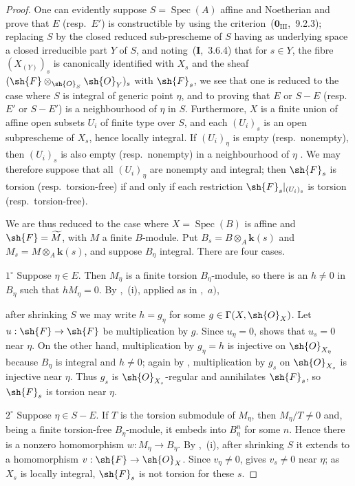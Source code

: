 \begin{proof}
One can evidently suppose $S=\operatorname{Spec}(A)$ affine and Noetherian and prove that $E$ (resp.\ $E'$) is constructible by using the criterion~($\mathbf{0}_{\mathrm{III}}$,~9.2.3); replacing $S$ by the closed reduced sub-prescheme of $S$ having as underlying space a closed irreducible part $Y$ of $S$, and noting~(\textbf{I},~3.6.4) that for $s\in Y$, the fibre $(X_{(Y)})_s$ is canonically identified with $X_s$ and the sheaf $(\sh{F}\otimes_{\sh{O}_S}\sh{O}_Y)_s$ with $\sh{F}_s$, we see that one is reduced to the case where $S$ is integral of generic point $\eta$, and to proving that $E$ or $S-E$ (resp.\ $E'$ or $S-E'$) is a neighbourhood of $\eta$ in $S$.
Furthermore, $X$ is a finite union of affine open subsets $U_i$ of finite type over $S$, and each $(U_i)_s$ is an open subprescheme of $X_s$, hence locally integral. If $(U_i)_\eta$ is empty (resp.\ nonempty), then $(U_i)_s$ is also empty (resp.\ nonempty) in a neighbourhood of $\eta$ . We may therefore suppose that all $(U_i)_\eta$ are nonempty and integral; then $\sh{F}_s$ is torsion (resp.\ torsion-free) if and only if each restriction $\sh{F}_s|_{(U_i)_s}$ is torsion (resp.\ torsion-free).

We are thus reduced to the case where $X=\operatorname{Spec}(B)$ is affine and $\sh{F}=\widetilde{M}$, with $M$ a finite $B$-module. Put $B_s=B\otimes_A\mathbf{k}(s)$ and $M_s=M\otimes_A\mathbf{k}(s)$, and suppose $B_\eta$ integral. There are four cases.

$1^\circ$ Suppose $\eta\in E$. Then $M_\eta$ is a finite torsion $B_\eta$-module, so there is an $h\neq 0$ in $B_\eta$ such that $hM_\eta=0$. By ,~(i), applied as in ,~$a)$,


after shrinking $S$ we may write $h=g_\eta$ for some $g\in\Gamma(X,\sh{O}_X)$. Let $u:\sh{F}\to\sh{F}$ be multiplication by $g$. Since $u_\eta=0$,  shows that $u_s=0$ near $\eta$. On the other hand, multiplication by $g_\eta=h$ is injective on $\sh{O}_{X_\eta}$ because $B_\eta$ is integral and $h\neq 0$; again by , multiplication by $g_s$ on $\sh{O}_{X_s}$ is injective near $\eta$. Thus $g_s$ is $\sh{O}_{X_s}$-regular and annihilates $\sh{F}_s$, so $\sh{F}_s$ is torsion near $\eta$.

$2^\circ$ Suppose $\eta\in S-E$. If $T$ is the torsion submodule of $M_\eta$, then $M_\eta/T\neq 0$ and, being a finite torsion-free $B_\eta$-module, it embeds into $B_\eta^n$ for some $n$. Hence there is a nonzero homomorphism $w:M_\eta\to B_\eta$. By ,~(i), after shrinking $S$ it extends to a homomorphism $v:\sh{F}\to\sh{O}_X$. Since $v_\eta\neq 0$,  gives $v_s\neq 0$ near $\eta$; as $X_s$ is locally integral, $\sh{F}_s$ is not torsion for these $s$.


\end{proof}
